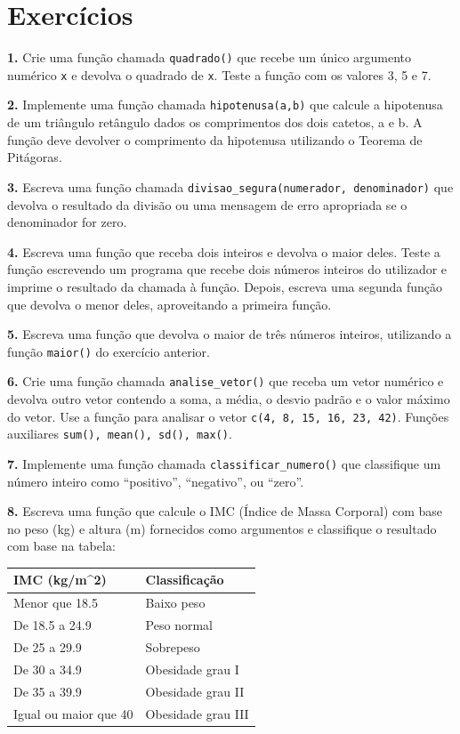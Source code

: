 \documentclass[
]{book}
\begin{document}
\section{Exercícios}\label{exercuxedcios-7}

\textbf{1.} Crie uma função chamada \texttt{quadrado()} que recebe um único
argumento numérico \texttt{x} e devolva o quadrado de \texttt{x}. Teste a função com
os valores 3, 5 e 7.

\textbf{2.} Implemente uma função chamada \texttt{hipotenusa(a,b)} que calcule a
hipotenusa de um triângulo retângulo dados os comprimentos dos dois
catetos, a e b. A função deve devolver o comprimento da hipotenusa
utilizando o Teorema de Pitágoras.

\textbf{3.} Escreva uma função chamada
\texttt{divisao\_segura(numerador,\ denominador)} que devolva o resultado da
divisão ou uma mensagem de erro apropriada se o denominador for zero.

\textbf{4.} Escreva uma função que receba dois inteiros e devolva o maior
deles. Teste a função escrevendo um programa que recebe dois números
inteiros do utilizador e imprime o resultado da chamada à função.
Depois, escreva uma segunda função que devolva o menor deles,
aproveitando a primeira função.

\textbf{5.} Escreva uma função que devolva o maior de três números inteiros,
utilizando a função \texttt{maior()} do exercício anterior.

\textbf{6.} Crie uma função chamada \texttt{analise\_vetor()} que receba um vetor
numérico e devolva outro vetor contendo a soma, a média, o desvio padrão
e o valor máximo do vetor. Use a função para analisar o vetor
\texttt{c(4,\ 8,\ 15,\ 16,\ 23,\ 42)}. Funções auxiliares
\texttt{sum(),\ mean(),\ sd(),\ max()}.

\textbf{7.} Implemente uma função chamada \texttt{classificar\_numero()} que
classifique um número inteiro como ``positivo'', ``negativo'', ou ``zero''.

\textbf{8.} Escreva uma função que calcule o IMC (Índice de Massa Corporal)
com base no peso (kg) e altura (m) fornecidos como argumentos e
classifique o resultado com base na tabela:

\begin{longtable}[]{@{}ll@{}}
\toprule\noalign{}
\textbf{IMC (kg/m\^{}2)} & \textbf{Classificação} \\
\midrule\noalign{}
\endhead
\bottomrule\noalign{}
\endlastfoot
Menor que 18.5 & Baixo peso \\
De 18.5 a 24.9 & Peso normal \\
De 25 a 29.9 & Sobrepeso \\
De 30 a 34.9 & Obesidade grau I \\
De 35 a 39.9 & Obesidade grau II \\
Igual ou maior que 40 & Obesidade grau III \\
\end{longtable}
\end{document}
